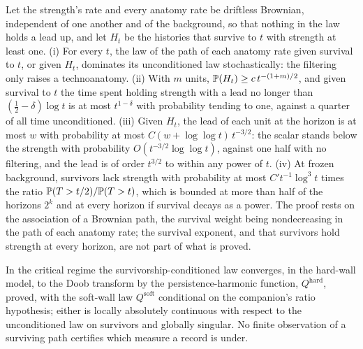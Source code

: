 \begin{theorem}\label{imp:pace}
Let the strength's rate and every anatomy rate be driftless Brownian,
independent of one another and of the background, so that nothing in the
law holds a lead up, and let $H_t$ be the histories that survive to $t$
with strength at least one. (i) For every $t$, the law of the path of
each anatomy rate given survival to $t$, or given $H_t$, dominates its
unconditioned law stochastically: the filtering only raises a
technoanatomy. (ii) With $m$ units, $\mathbb{P}(H_t)\ge c\,t^{-(1+m)/2}$, and
given survival to $t$ the time spent holding strength with a lead no
longer than $(\tfrac12-\delta)\log t$ is at most $t^{1-\delta}$ with
probability tending to one, against a quarter of all time unconditioned.
(iii) Given $H_t$, the lead of each unit at the horizon is at most $w$
with probability at most $C(w+\log\log t)\,t^{-3/2}$: the scalar stands
below the strength with probability $O(t^{-3/2}\log\log t)$, against one
half with no filtering, and the lead is of order $t^{3/2}$ to within any
power of $t$. (iv) At frozen background, survivors lack strength with
probability at most $C't^{-1}\log^3t$ times the ratio
$\mathbb{P}(T>t/2)/\mathbb{P}(T>t)$, which is bounded at more than half of the horizons
$2^k$ and at every horizon if survival decays as a power. The proof rests
on the association of a Brownian path, the survival weight being
nondecreasing in the path of each anatomy rate; the survival exponent,
and that survivors hold strength at every horizon, are not part of what
is proved.
\end{theorem}

\begin{theorem}\label{imp:ceiling}
In the critical regime the survivorship-conditioned law converges, in the
hard-wall model, to the Doob transform by the persistence-harmonic
function, $Q^{\mathrm{hard}}$, proved, with the soft-wall law
$Q^{\mathrm{soft}}$ conditional on the companion's ratio hypothesis;
either is locally absolutely continuous with respect to the
unconditioned law on survivors and globally singular. No finite observation of a surviving path certifies
which measure a record is under.
\end{theorem}

